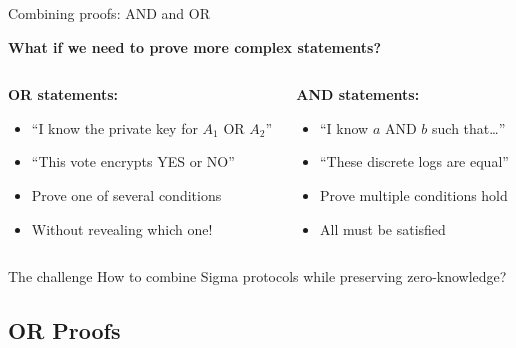 \documentclass[aspectratio=169, lualatex, handout]{beamer}
\begin{document}
\begin{frame}{Combining proofs: AND and OR}
	\begin{center}
		\textbf{What if we need to prove more complex statements?}
	\end{center}
	\vspace{0.5em}
	\begin{columns}[c]
		\begin{column}{0.5\textwidth}
			\textbf{OR statements:}
			\begin{itemize}
				\item ``I know the private key for $A_1$ OR $A_2$''
				\item ``This vote encrypts YES or NO''
				\item Prove one of several conditions
				\item Without revealing which one!
			\end{itemize}
		\end{column}
		\begin{column}{0.5\textwidth}
			\textbf{AND statements:}
			\begin{itemize}
				\item ``I know $a$ AND $b$ such that\ldots''
				\item ``These discrete logs are equal''
				\item Prove multiple conditions hold
				\item All must be satisfied
			\end{itemize}
		\end{column}
	\end{columns}
	\vspace{0.5em}
	\begin{alertblock}{The challenge}
		How to combine Sigma protocols while preserving zero-knowledge?
	\end{alertblock}
\end{frame}

\subsection{OR Proofs}
\end{document}
